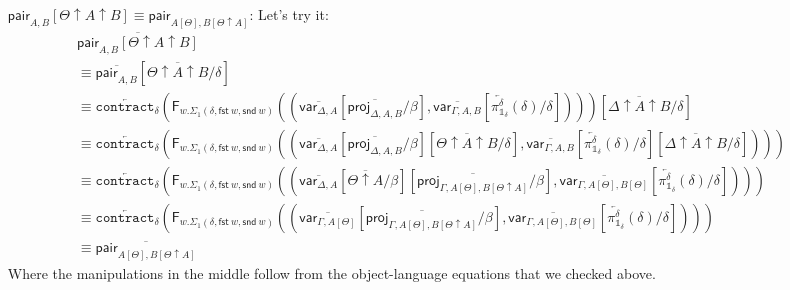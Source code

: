 \documentclass[10pt]{article}
\theoremstyle{definition}
\newcommand\dsd[1]{\ensuremath{\mathsf{#1}}}
\newcommand{\app}[2]{\ensuremath{#1 \: #2}}
\newcommand{\fst}[1]{\app{\dsd{fst}}{#1}}
\newcommand{\snd}[1]{\app{\dsd{snd}}{#1}}
\newcommand{\rewrite}[2]{\overleftarrow{#1}(#2)}
\newcommand\FIs[2]{\ensuremath{\mathsf{F}_{#1}{(#2)}}}
\newcommand{\upstairs}[1]{\overline{#1}}
\newcommand\proj[1]{\ensuremath{\mathsf{proj}_{#1}}}
\newcommand\qvar[1]{\ensuremath{\mathsf{var}_{#1}}}
\newcommand\One{\ensuremath{\mathds{1}}}
\newcommand\contract[1]{\ensuremath{\mathtt{contract}_{#1}}}
\newcommand\qpair[1]{\ensuremath{\mathsf{pair}_{#1}}}
\begin{document}
\begin{enumerate}[style = multiline, labelwidth = 80pt]
\item[{$\qpair{A, B}[\Theta \uparrow A \uparrow B] \equiv \qpair{A[\Theta], B[\Theta \uparrow A]}$}:]
Let's try it:
\begin{align*}
&\upstairs{\qpair{A, B}[\Theta \uparrow A \uparrow B]} \\
&\equiv \upstairs{\qpair{A, B}}[\upstairs{\Theta \uparrow A \uparrow B}/\delta] \\
&\equiv \rewrite{\contract{\delta}}{\FIs{w. \Sigma_1(\delta,\fst w, \snd w)}{(\upstairs{\qvar{\Delta, A}}[\upstairs{\proj{\Delta, A, B}}/\beta], \upstairs{\qvar{\Gamma, A, B}}[\rewrite{\pi^\delta_{\One_\delta}}{\delta}/\delta])}}[\upstairs{\Delta \uparrow A \uparrow B}/\delta] \\
&\equiv \rewrite{\contract{\delta}}{\FIs{w. \Sigma_1(\delta,\fst w, \snd w)}{(\upstairs{\qvar{\Delta, A}}[\upstairs{\proj{\Delta, A, B}}/\beta][\upstairs{\Theta \uparrow A \uparrow B}/\delta], \upstairs{\qvar{\Gamma, A, B}}[\rewrite{\pi^\delta_{\One_\delta}}{\delta}/\delta][\upstairs{\Delta \uparrow A \uparrow B}/\delta])}} \\
&\equiv \rewrite{\contract{\delta}}{\FIs{w. \Sigma_1(\delta,\fst w, \snd w)}{(\upstairs{\qvar{\Delta, A}}[\upstairs{\Theta \uparrow A}/\beta][\upstairs{\proj{\Gamma, A[\Theta], B[\Theta \uparrow A]}}/\beta], \upstairs{\qvar{\Gamma, A[\Theta], B[\Theta]}}[\rewrite{\pi^\delta_{\One_\delta}}{\delta}/\delta])}} \\
&\equiv \rewrite{\contract{\delta}}{\FIs{w. \Sigma_1(\delta,\fst w, \snd w)}{(\upstairs{\qvar{\Gamma, A[\Theta]}}[\upstairs{\proj{\Gamma, A[\Theta], B[\Theta \uparrow A]}}/\beta], \upstairs{\qvar{\Gamma, A[\Theta], B[\Theta]}}[\rewrite{\pi^\delta_{\One_\delta}}{\delta}/\delta])}} \\
&\equiv \upstairs{\qpair{A[\Theta], B[\Theta \uparrow A]}}
\end{align*}
Where the manipulations in the middle follow from the object-language equations that we checked above.


\end{enumerate}
\end{document}
